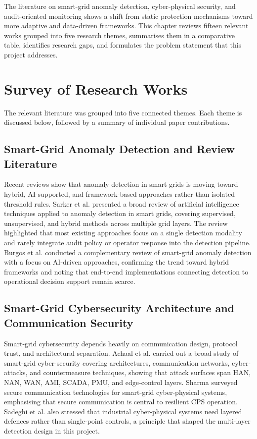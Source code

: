 
The literature on smart-grid anomaly detection, cyber-physical security, and audit-oriented monitoring shows a shift from static protection mechanisms toward more adaptive and data-driven frameworks. This chapter reviews fifteen relevant works grouped into five research themes, summarises them in a comparative table, identifies research gaps, and formulates the problem statement that this project addresses.

\section{Survey of Research Works}

The relevant literature was grouped into five connected themes. Each theme is discussed below, followed by a summary of individual paper contributions.

\subsection{Smart-Grid Anomaly Detection and Review Literature}

Recent reviews show that anomaly detection in smart grids is moving toward hybrid, AI-supported, and framework-based approaches rather than isolated threshold rules. Sarker et al. \cite{sarker2026review} presented a broad review of artificial intelligence techniques applied to anomaly detection in smart grids, covering supervised, unsupervised, and hybrid methods across multiple grid layers. The review highlighted that most existing approaches focus on a single detection modality and rarely integrate audit policy or operator response into the detection pipeline. Burgos et al. \cite{burgos2024review} conducted a complementary review of smart-grid anomaly detection with a focus on AI-driven approaches, confirming the trend toward hybrid frameworks and noting that end-to-end implementations connecting detection to operational decision support remain scarce.

\subsection{Smart-Grid Cybersecurity Architecture and Communication Security}

Smart-grid cybersecurity depends heavily on communication design, protocol trust, and architectural separation. Achaal et al. \cite{achaal2024study} carried out a broad study of smart-grid cyber-security covering architectures, communication networks, cyber-attacks, and countermeasure techniques, showing that attack surfaces span HAN, NAN, WAN, AMI, SCADA, PMU, and edge-control layers. Sharma \cite{sharma2024survey} surveyed secure communication technologies for smart-grid cyber-physical systems, emphasising that secure communication is central to resilient CPS operation. Sadeghi et al. \cite{sadeghi2015security} also stressed that industrial cyber-physical systems need layered defences rather than single-point controls, a principle that shaped the multi-layer detection design in this project.

